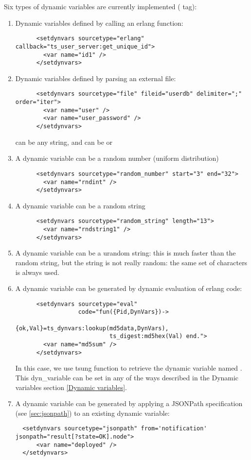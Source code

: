 \documentclass{TSUNG-en}
\begin{document}
Six types of dynamic variables are currently implemented ( tag):
\begin{enumerate}
\item Dynamic variables defined by calling an erlang function:
\begin{Verbatim}
      <setdynvars sourcetype="erlang" callback="ts_user_server:get_unique_id">
        <var name="id1" />
      </setdynvars>
\end{Verbatim}
\item Dynamic variables defined by parsing an external file:
\begin{Verbatim}
      <setdynvars sourcetype="file" fileid="userdb" delimiter=";" order="iter">
        <var name="user" />
        <var name="user_password" />
      </setdynvars>
\end{Verbatim}
 can be any string, and  can be
 or 
\item A dynamic variable can be a random number (uniform distribution)
\begin{Verbatim}
      <setdynvars sourcetype="random_number" start="3" end="32">
        <var name="rndint" />
      </setdynvars>
\end{Verbatim}
\item A dynamic variable can be a random string
\begin{Verbatim}
      <setdynvars sourcetype="random_string" length="13">
        <var name="rndstring1" />
      </setdynvars>
\end{Verbatim}
\item A dynamic variable can be a urandom string: this is much faster than
  the random string, but the string is not really random: the same set
  of characters is always used.
\item A dynamic variable can be generated by dynamic evaluation of
  erlang code:
\begin{Verbatim}
      <setdynvars sourcetype="eval"
                  code="fun({Pid,DynVars})->
                           {ok,Val}=ts_dynvars:lookup(md5data,DynVars),
                           ts_digest:md5hex(Val) end.">
        <var name="md5sum" />
      </setdynvars>
\end{Verbatim}

In this case, we use tsung function  to retrieve the
dynamic variable named . This dyn\_variable 
can be set in any of the ways described in the Dynamic variables
section \ref{Dynamic variables}.
\item A dynamic variable can be generated by applying a JSONPath
  specification (see \ref{sec:jsonpath}) to an existing dynamic
  variable:
\begin{Verbatim}
  <setdynvars sourcetype="jsonpath" from='notification' jsonpath="result[?state=OK].node">
      <var name="deployed" />
  </setdynvars>
\end{Verbatim}

\end{enumerate}
\end{document}
